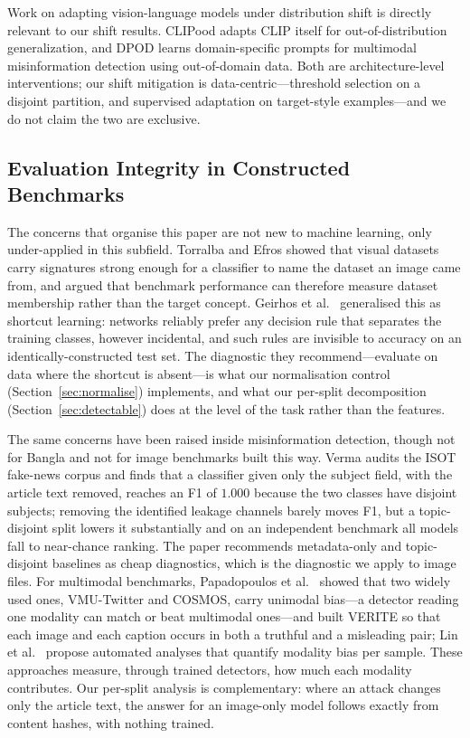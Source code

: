 \documentclass[pdflatex,sn-mathphys-num]{sn-jnl}
\begin{document}
Work on adapting vision-language models under distribution shift is directly
relevant to our shift results. CLIPood \cite{clipood} adapts CLIP itself for
out-of-distribution generalization, and DPOD \cite{dpod} learns
domain-specific prompts for multimodal misinformation detection using
out-of-domain data. Both are architecture-level interventions; our shift
mitigation is data-centric---threshold selection on a disjoint partition, and
supervised adaptation on target-style examples---and we do not claim the two
are exclusive.

\subsection{Evaluation Integrity in Constructed Benchmarks}
\label{sec:related-integrity}

The concerns that organise this paper are not new to machine learning, only
under-applied in this subfield. Torralba and Efros \cite{datasetbias} showed
that visual datasets carry signatures strong enough for a classifier to name
the dataset an image came from, and argued that benchmark performance can
therefore measure dataset membership rather than the target concept. Geirhos
et al.\ \cite{shortcut} generalised this as shortcut learning: networks
reliably prefer any decision rule that separates the training classes, however
incidental, and such rules are invisible to accuracy on an
identically-constructed test set. The diagnostic they recommend---evaluate on
data where the shortcut is absent---is what our normalisation control
(Section~\ref{sec:normalise}) implements, and what our per-split decomposition
(Section~\ref{sec:detectable}) does at the level of the task rather than the
features.

The same concerns have been raised inside misinformation detection, though not
for Bangla and not for image benchmarks built this way. Verma \cite{verma}
audits the ISOT fake-news corpus and finds that a classifier given only the
subject field, with the article text removed, reaches an F1 of $1.000$ because
the two classes have disjoint subjects; removing the identified leakage
channels barely moves F1, but a topic-disjoint split lowers it substantially
and on an independent benchmark all models fall to near-chance ranking. The
paper recommends metadata-only and topic-disjoint baselines as cheap
diagnostics, which is the diagnostic we apply to image files. For multimodal
benchmarks, Papadopoulos et al.\ \cite{verite} showed that two widely used
ones, VMU-Twitter and COSMOS, carry unimodal bias---a detector reading one
modality can match or beat multimodal ones---and built VERITE so that each
image and each caption occurs in both a truthful and a misleading pair; Lin et
al.\ \cite{linmodality} propose automated analyses that quantify modality bias
per sample. These approaches measure, through trained detectors, how much each
modality contributes. Our per-split analysis is complementary: where an attack
changes only the article text, the answer for an image-only model follows
exactly from content hashes, with nothing trained.
\end{document}
